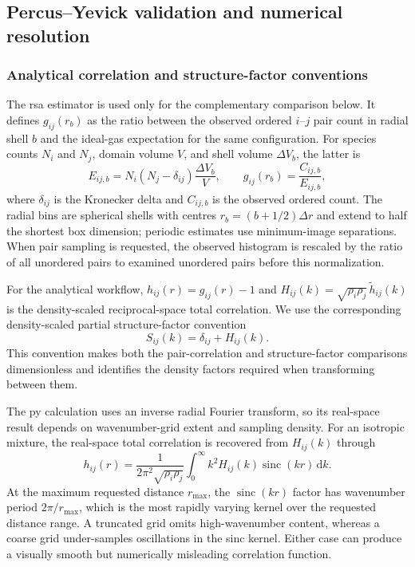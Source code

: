 \documentclass[preprint,12pt]{elsarticle}
\begin{document}
\subsection{Percus--Yevick validation and numerical resolution}

\subsubsection{Analytical correlation and structure-factor conventions}

The \gls{rsa} estimator is used only for the complementary comparison below. %
It defines $g_{ij}(r_b)$ as the ratio between the observed ordered $i$--$j$ pair count in radial shell $b$ and the ideal-gas expectation for the same configuration. %
For species counts $N_i$ and $N_j$, domain volume $V$, and shell volume $\Delta V_b$, the latter is
\begin{equation}
    E_{ij,b} = N_i\left(N_j-\delta_{ij}\right)\frac{\Delta V_b}{V},
    \qquad
    g_{ij}(r_b) = \frac{C_{ij,b}}{E_{ij,b}},
\end{equation}
where $\delta_{ij}$ is the Kronecker delta and $C_{ij,b}$ is the observed ordered count. %
The radial bins are spherical shells with centres $r_b=(b+1/2)\Delta r$ and extend to half the shortest box dimension; periodic estimates use minimum-image separations. %
When pair sampling is requested, the observed histogram is rescaled by the ratio of all unordered pairs to examined unordered pairs before this normalization. %

For the analytical workflow, $h_{ij}(r)=g_{ij}(r)-1$ and $H_{ij}(k)=\sqrt{\rho_i\rho_j}\,\tilde{h}_{ij}(k)$ is the density-scaled reciprocal-space total correlation. %
We use the corresponding density-scaled partial structure-factor convention
\begin{equation}
    S_{ij}(k)=\delta_{ij}+H_{ij}(k).
    \label{eq:partial-structure-factor}
\end{equation}
This convention makes both the pair-correlation and structure-factor comparisons dimensionless and identifies the density factors required when transforming between them. %

The \gls{py} calculation uses an inverse radial Fourier transform, so its real-space result depends on wavenumber-grid extent and sampling density. %
For an isotropic mixture, the real-space total correlation is recovered from $H_{ij}(k)$ through
\begin{equation}
    h_{ij}(r) = \frac{1}{2\pi^2\sqrt{\rho_i\rho_j}}
    \int_0^\infty k^2 H_{ij}(k)\operatorname{sinc}(kr)\,\mathrm{d}k.
\end{equation}
At the maximum requested distance $r_{\max}$, the $\operatorname{sinc}(kr)$ factor has wavenumber period $2\pi/r_{\max}$, which is the most rapidly varying kernel over the requested distance range. %
A truncated grid omits high-wavenumber content, whereas a coarse grid under-samples oscillations in the sinc kernel. %
Either case can produce a visually smooth but numerically misleading correlation function. %
\end{document}
